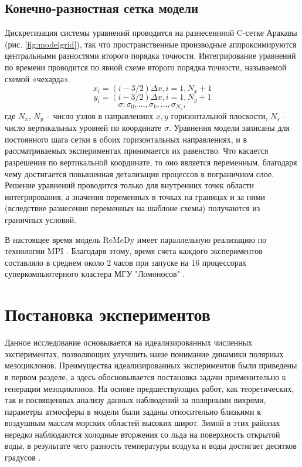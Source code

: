\documentclass[12pt,a4paper]{report}
\begin{document}
\subsection{Конечно-разностная сетка модели}
Дискретизация системы уравнений проводится на разнесеннной C-сетке Аракавы (рис. \ref{fig:modelgrid}), так что пространственные производные аппроксимируются центральными разностями второго порядка точности. Интегрирование уравнений по времени проводится по явной схеме второго порядка точности, называемой схемой «чехарда».
$$x_i=(i-3/2)\Delta x,i=1,N_x+1$$
$$y_i=(i-3/2)\Delta x,i=1,N_y+1$$
$$\sigma: \sigma_0, \dots, \sigma_k,\dots,\sigma_{N_s},$$
где $N_x$, $N_y$ – число узлов в направлениях $x,y$ горизонтальной плоскости, $N_s$ – число вертикальных уровней по координате $\sigma$. Уравнения модели записаны для постоянного шага сетки в обоих горизонтальных направлениях, и в рассматриваемых экспериментах принимается их равенство. Что касается разрешения по вертикальной координате, то оно является переменным, благодаря чему достигается повышенная детализация процессов в пограничном слое. 
Решение уравнений проводится только для внутренних точек области интегрирования, а значения переменных в точках на границах и за ними (вследствие разнесения переменных на шаблоне схемы) получаются из граничных условий.

В настоящее время модель ReMeDy имеет параллельную реализацию по технологии MPI \citep{StepanenkoMikushin2008}. Благодаря этому, время счета каждого экспериментов составляло в среднем около 2 часов при запуске на 16 процессорах суперкомпьютерного кластера МГУ "Ломоносов" \citep{VoevodinEtAl2012}.

\section{Постановка экспериментов}
\label{sec:expsetup}
Данное исследование основывается на идеализированных численных экспериментах, позволяющих улучшить наше понимание динамики полярных мезоциклонов. Преимущества идеализированных экспериментов были приведены в первом разделе, а здесь обосновывается постановка задачи применительно к генерации мезоциклонов.
На основе предшествующих работ, как теоретических, так и посвященных анализу данных наблюдений за полярными вихрями, параметры атмосферы в модели были заданы относительно близкими к воздушным массам морских областей высоких широт. Зимой в этих районах нередко наблюдаются холодные вторжения со льда на поверхность открытой воды, в результате чего разность температуры воздуха и воды  достигает десятков градусов \citep{ChechinEtAl2013}.
\end{document}
